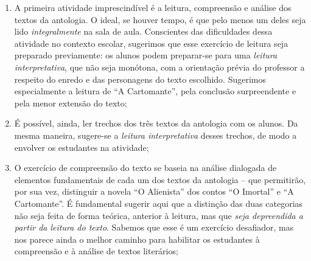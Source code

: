 \documentclass{extarticle}
\begin{document}
\begin{enumerate}
\item A primeira atividade imprescindível é a leitura, compreensão e
análise dos textos da antologia. O ideal, se houver tempo, é que pelo
menos um deles seja lido \emph{integralmente} na sala de aula.
Conscientes das dificuldades dessa atividade no contexto escolar,
sugerimos que esse exercício de leitura seja preparado previamente: os
alunos podem preparar-se para uma \emph{leitura interpretativa}, que não
seja monótona, com a orientação prévia do professor a respeito do enredo
e das personagens do texto escolhido. Sugerimos especialmente a leitura
de ``A Cartomante'', pela conclusão surpreendente e pela menor extensão
do texto;

\item É possível, ainda, ler trechos dos três textos da antologia com os
alunos. Da mesma maneira, sugere-se a \emph{leitura interpretativa}
desses trechos, de modo a envolver os estudantes na atividade;

\item O exercício de compreensão do texto se baseia na análise dialogada de
elementos fundamentais de cada um dos textos da antologia -- que
permitirão, por sua vez, distinguir a novela ``O Alienista'' dos contos
``O Imortal'' e ``A Cartomante''. É fundamental sugerir aqui que a
distinção das duas categorias não seja feita de forma teórica, anterior
à leitura, mas que \emph{seja depreendida a partir da leitura do texto}.
Sabemos que esse é um exercício desafiador, mas nos parece ainda o
melhor caminho para habilitar os estudantes à compreensão e à análise de
textos literários;


\end{enumerate}
\end{document}
